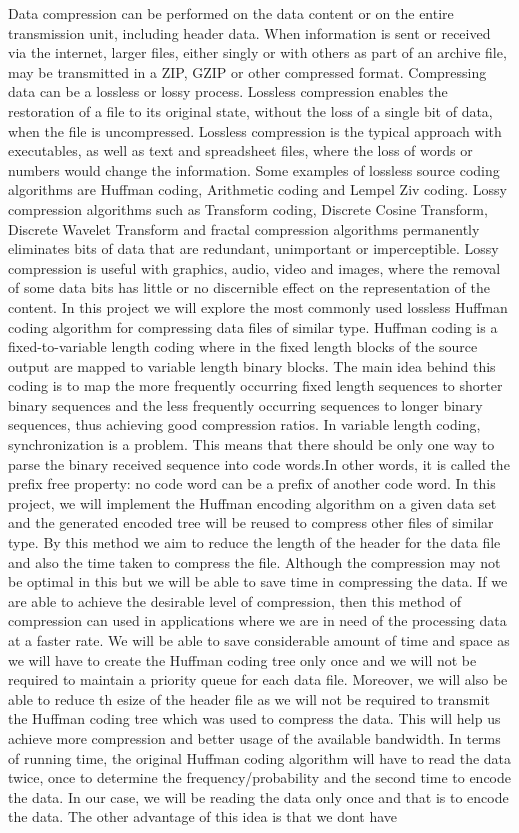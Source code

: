 \documentclass[10pt,conference]{IEEEtran}
\begin{document}
{Data compression can be performed on the data content or on the entire transmission unit, including header data. When information is sent or received via the internet, larger files, either singly or with others as part of an archive file, may be transmitted in a ZIP, GZIP or other compressed format. Compressing data can be a lossless or lossy process. Lossless compression enables the restoration of a file to its original state, without the loss of a single bit of data, when the file is uncompressed. Lossless compression is the typical approach with executables, as well as text and spreadsheet files, where the loss of words or numbers would change the information. Some examples of lossless source coding algorithms are Huffman coding, Arithmetic coding and Lempel Ziv coding. Lossy compression algorithms such as Transform coding, Discrete Cosine Transform, Discrete Wavelet Transform and fractal compression algorithms permanently eliminates bits of data that are redundant, unimportant or imperceptible. Lossy compression is useful with graphics, audio, video and images, where the removal of some data bits has little or no discernible effect on the representation of the content. In this project we will explore the most commonly used lossless Huffman coding algorithm for compressing data files of similar type. Huffman coding is a fixed-to-variable length coding where in the fixed length blocks of the source output are mapped to variable length binary blocks. The main idea behind this coding is to map the more frequently occurring fixed length sequences to shorter binary sequences and the less frequently occurring sequences to longer binary sequences, thus achieving good compression ratios. In variable length coding, synchronization is a problem. This means that there should be only one way to parse the binary received sequence into code words.In other words, it is called the prefix free property: no code word can be a prefix of another code word. In this project, we will implement the Huffman encoding algorithm on a given data set and the generated encoded tree will be reused to compress other files of similar type. By this method we aim to reduce the length of the header for the data file and also the time taken to compress the file. Although the compression may not be optimal in this but we will be able to save time in compressing the data. If we are able to achieve the desirable level of compression, then this method of compression can used in applications where we are in need of the processing data at a faster rate. We will be able to save considerable amount of time and space as we will have to create the Huffman coding tree only once and we will not be required to maintain a priority queue for each data file. Moreover, we will also be able to reduce th esize of the  header file as we will not be required to transmit the Huffman coding tree which was used to compress the data. This will help us achieve more compression and better usage of the available bandwidth. In terms of running time, the original Huffman coding algorithm will have to read the data twice, once to determine the frequency/probability and the second time to encode the data. In our case, we will be reading the data only once and that is to encode the data. The other advantage of this idea is that we dont have }
\end{document}
